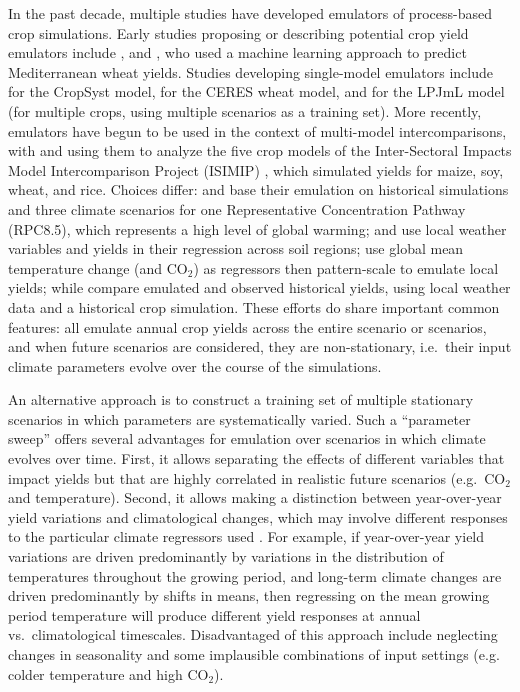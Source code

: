 \documentclass[esd, manuscript]{copernicus} %
\begin{document}

In the past decade, multiple studies have developed emulators of process-based crop simulations. Early studies proposing or describing potential crop yield emulators include \citet{Howden2005, raisen2006, Lobell2010}, and \citet{Ferrise2011}, who used a machine learning approach to predict Mediterranean wheat yields. Studies developing single-model emulators include  \citet{Holzkamper2012} for the CropSyst model, \citet{RUANE2013a} for the CERES wheat model, and \citet{Oyebamiji15} for the LPJmL model (for multiple crops, using multiple scenarios as a training set). More recently, emulators have begun to be used in the context of multi-model intercomparisons, with \citet{BLANC2015, BLANC2017, Ostberg2018} and \citet{Mistry2017} using them to analyze the five crop models of the Inter-Sectoral Impacts Model Intercomparison Project (ISIMIP) \citep{Warszawski3228}, which simulated yields for maize, soy, wheat, and rice. Choices differ: \citet{BLANC2015} and \citet{BLANC2017} base their emulation on historical simulations and three climate scenarios for one Representative Concentration Pathway (RPC8.5), which represents a high level of global warming; and use local weather variables and yields in their regression across soil regions; \citet{Ostberg2018} use global mean temperature change (and CO$_2$) as regressors then pattern-scale to emulate local yields; while \citet{Mistry2017} compare emulated and observed historical yields, using local weather data and a historical crop simulation. These efforts do share important common features: all emulate annual crop yields across the entire scenario or scenarios, and when future scenarios are considered, they are non-stationary, i.e.\ their input climate parameters evolve over the course of the simulations.

An alternative approach is to construct a training set of multiple stationary scenarios in which parameters are systematically varied. Such a ``parameter sweep'' offers several advantages for emulation over scenarios in which climate evolves over time. First, it allows separating the effects of different variables that impact yields but that are highly correlated in realistic future scenarios (e.g.\ CO$_2$ and temperature). Second, it allows making a distinction between year-over-year yield variations and climatological changes, which may involve different responses to the particular climate regressors used \citep[e.g.][]{Ruane2016}. For example, if year-over-year yield variations are driven predominantly by variations in the distribution of temperatures throughout the growing period, and long-term climate changes are driven predominantly by shifts in means, then regressing on the mean growing period temperature will produce different yield responses at annual vs.\ climatological timescales. Disadvantaged of this approach include neglecting changes in seasonality and some implausible combinations of input settings (e.g. colder temperature and high CO$_2$). 
\end{document}
